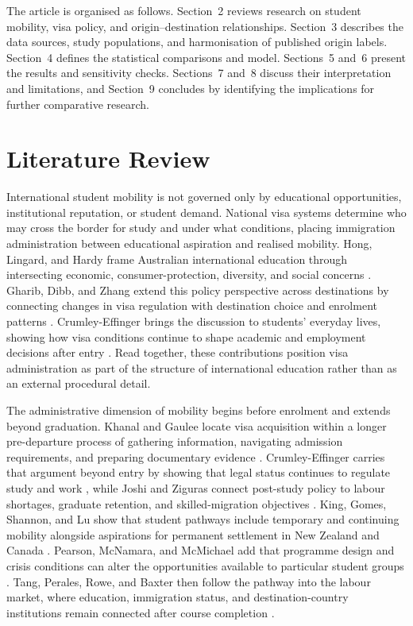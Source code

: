 \documentclass[runningheads]{llncs}
\begin{document}
The article is organised as follows. Section~2 reviews research on student mobility, visa policy, and origin--destination relationships. Section~3 describes the data sources, study populations, and harmonisation of published origin labels. Section~4 defines the statistical comparisons and model. Sections~5 and~6 present the results and sensitivity checks. Sections~7 and~8 discuss their interpretation and limitations, and Section~9 concludes by identifying the implications for further comparative research.

\section{Literature Review}

International student mobility is not governed only by educational opportunities, institutional reputation, or student demand. National visa systems determine who may cross the border for study and under what conditions, placing immigration administration between educational aspiration and realised mobility. Hong, Lingard, and Hardy frame Australian international education through intersecting economic, consumer-protection, diversity, and social concerns \cite{HongEtAl2023}. Gharib, Dibb, and Zhang extend this policy perspective across destinations by connecting changes in visa regulation with destination choice and enrolment patterns \cite{GharibEtAl2026}. Crumley-Effinger brings the discussion to students' everyday lives, showing how visa conditions continue to shape academic and employment decisions after entry \cite{CrumleyEffinger2024}. Read together, these contributions position visa administration as part of the structure of international education rather than as an external procedural detail.

The administrative dimension of mobility begins before enrolment and extends beyond graduation. Khanal and Gaulee locate visa acquisition within a longer pre-departure process of gathering information, navigating admission requirements, and preparing documentary evidence \cite{KhanalGaulee2019}. Crumley-Effinger carries that argument beyond entry by showing that legal status continues to regulate study and work \cite{CrumleyEffinger2024}, while Joshi and Ziguras connect post-study policy to labour shortages, graduate retention, and skilled-migration objectives \cite{JoshiZiguras2024}. King, Gomes, Shannon, and Lu show that student pathways include temporary and continuing mobility alongside aspirations for permanent settlement in New Zealand and Canada \cite{KingEtAl2024}. Pearson, McNamara, and McMichael add that programme design and crisis conditions can alter the opportunities available to particular student groups \cite{PearsonEtAl2022}. Tang, Perales, Rowe, and Baxter then follow the pathway into the labour market, where education, immigration status, and destination-country institutions remain connected after course completion \cite{TangEtAl2022}.
\end{document}
